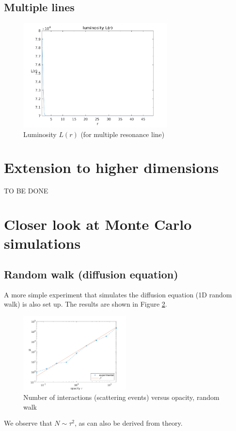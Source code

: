 \documentclass[../main/main.tex]{subfiles}
\begin{document}
\subsection{Multiple lines}
\begin{figure}[!htp]
\centering
\includegraphics[width=0.7\textwidth]{../../two_resonance_lines/figures/luminosity_multiple_resonance_line.png}
\caption{Luminosity $L(r)$ (for multiple resonance line)}
\label{luminosity_multiple_resonance_line}
\end{figure}


\newpage
\section{Extension to higher dimensions}
TO BE DONE

\newpage
\section{Closer look at Monte Carlo simulations}
\label{diffusion_Monte_Carlo_mean_free_path}

\subsection{Random walk (diffusion equation)} A more simple experiment that simulates the diffusion equation (1D random walk) is also set up. The results are shown in Figure \ref{random_walk_N_vs_tau}.
	\begin{figure}[!htp]
	\centering
	\includegraphics[width=0.5\textwidth]{../../introductory_exercises/limb_darkening/data/diff_N_vs_opacity.png}
	\caption{Number of interactions (scattering events) versus 	opacity, random walk}
	\label{random_walk_N_vs_tau}
	\end{figure}
We observe that $N \sim \tau^2$, as can also be derived from theory.
\end{document}
